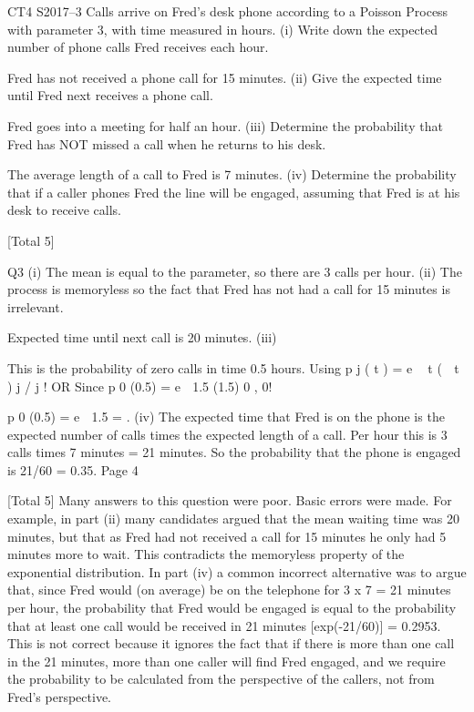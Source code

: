 \documentclass[a4paper,12pt]{article}
\begin{document}
CT4 S2017–3 
Calls arrive on Fred’s desk phone according to a Poisson Process with parameter 3,
with time measured in hours.
(i)
Write down the expected number of phone calls Fred receives each hour.

Fred has not received a phone call for 15 minutes.
(ii)
Give the expected time until Fred next receives a phone call.

Fred goes into a meeting for half an hour.
(iii)
Determine the probability that Fred has NOT missed a call when he returns to
his desk.

The average length of a call to Fred is 7 minutes.
(iv)
Determine the probability that if a caller phones Fred the line will be engaged,
assuming that Fred is at his desk to receive calls.

[Total 5]


Q3
(i) The mean is equal to the parameter, so there are 3 calls per hour.
(ii) The process is memoryless so the fact that Fred has not had a call for
15 minutes is irrelevant.

Expected time until next call is 20 minutes.
(iii)

This is the probability of zero calls in time 0.5 hours.
Using p j ( t ) \;=\; e  t (  t ) j / j !
OR
Since p 0 (0.5) \;=\;
e  1.5 (1.5) 0
,
0!

p 0 (0.5) \;=\; e  1.5 \;= .
(iv)
The expected time that Fred is on the phone is the expected number of calls times the expected length of a call.
Per hour this is 3 calls times 7 minutes = 21 minutes.
So the probability that the phone is engaged is 21/60 = 0.35.
Page 4



[Total 5]%
Many answers to this question were poor. Basic errors were made. For example, in part (ii) many candidates argued that the mean waiting
time was 20 minutes, but that as Fred had not received a call for 15 minutes he only had 5 minutes more to wait. This contradicts the
memoryless property of the exponential distribution. In part (iv) a common incorrect alternative was to argue that, since Fred would (on
average) be on the telephone for 3 x 7 = 21 minutes per hour, the probability that Fred would be engaged is equal to the probability that
at least one call would be received in 21 minutes [exp(-21/60)] = 0.2953. This is not correct because it ignores the fact that if there is
more than one call in the 21 minutes, more than one caller will find Fred engaged, and we require the probability to be calculated from the
perspective of the callers, not from Fred’s perspective.
\end{document}
